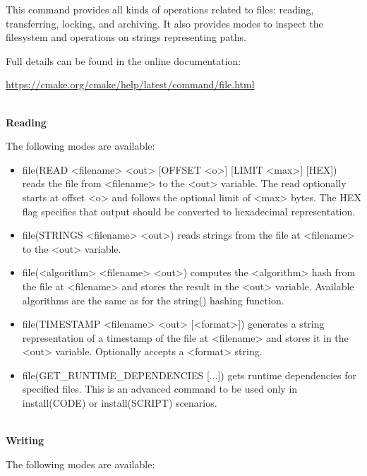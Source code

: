 This command provides all kinds of operations related to files: reading, transferring, locking, and archiving. It also provides modes to inspect the filesystem and operations on strings representing paths.

Full details can be found in the online documentation: 

\url{https://cmake.org/cmake/help/latest/command/file.html}

\hspace*{\fill} \\ %
\noindent
\textbf{Reading}

The following modes are available:

\begin{itemize}
\item 
file(READ <filename> <out> [OFFSET <o>] [LIMIT <max>] [HEX]) reads the file from <filename> to the <out> variable. The read optionally starts at offset <o> and follows the optional limit of <max> bytes. The HEX flag specifies that output should be converted to hexadecimal representation.

\item 
file(STRINGS <filename> <out>) reads strings from the file at <filename> to the <out> variable.

\item 
file(<algorithm> <filename> <out>) computes the <algorithm> hash from the file at <filename> and stores the result in the <out> variable. Available algorithms are the same as for the string() hashing function.

\item 
file(TIMESTAMP <filename> <out> [<format>]) generates a string representation of a timestamp of the file at <filename> and stores it in the <out> variable. Optionally accepts a <format> string.

\item 
file(GET\_RUNTIME\_DEPENDENCIES [...]) gets runtime dependencies for specified files. This is an advanced command to be used only in install(CODE) or install(SCRIPT) scenarios.
\end{itemize}


\hspace*{\fill} \\ %
\noindent
\textbf{Writing}

The following modes are available:

